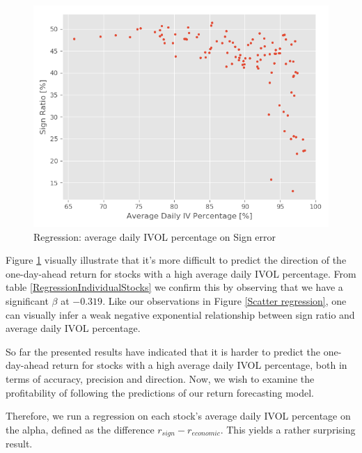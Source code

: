 \begin{figure}[h]
    \centering
    \includegraphics[scale = 0.5]{Plot/IndividualStockRegression1.png}
    \caption{Regression: average daily IVOL percentage on Sign error}
    \label{IVSignError}
\end{figure}

Figure \ref{IVSignError} visually illustrate that it's more difficult to predict the direction of the one-day-ahead return for stocks with a high average daily IVOL percentage. From table \ref{RegressionIndividualStocks} we confirm this by observing that we have a significant $\beta$ at $-0.319$. Like our observations in Figure \ref{Scatter regression}, one can visually infer a weak negative exponential relationship between sign ratio and average daily IVOL percentage.

So far the presented results have indicated that it is harder to predict the one-day-ahead return for stocks with a high average daily IVOL percentage, both in terms of accuracy, precision and direction. Now, we wish to examine the profitability of following the predictions of our return forecasting model. 

Therefore, we run a regression on each stock’s average daily IVOL percentage on the alpha, defined as the difference $r_{sign}-r_{economic}$. This yields a rather surprising result.

